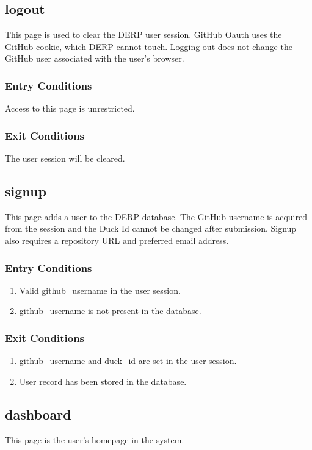 \subsection*{logout}
This page is used to clear the DERP user session. GitHub Oauth uses the GitHub cookie, which DERP cannot touch. Logging out does not change the GitHub user associated with the user's browser.

\subsubsection*{Entry Conditions}
Access to this page is unrestricted.

\subsubsection*{Exit Conditions}
The user session will be cleared.


\subsection*{signup}
This page adds a user to the DERP database. The GitHub username is acquired from the session and the Duck Id cannot be changed after submission. Signup also requires a repository URL and preferred email address.

\subsubsection*{Entry Conditions}
\begin{enumerate}
\item Valid github\_username in the user session.
\item github\_username is not present in the database.
\end{enumerate}

\subsubsection*{Exit Conditions}
\begin{enumerate}
\item github\_username and duck\_id are set in the user session.
\item User record has been stored in the database.
\end{enumerate}


\subsection*{dashboard}
This page is the user's homepage in the system.

